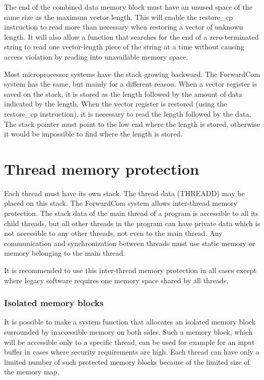 \documentclass[forwardcom.tex]{subfiles}
\begin{document}
\label{extraSpaceAtEndOfData}
The end of the combined data memory block must have an unused space of the same size as the maximum vector length. This will enable the restore\_cp instruction to read more than necessary when restoring a vector of unknown length. It will also allow a function that searches for the end of a zero-terminated string to read one vector-length piece of the string at a time without causing access violation by reading into unavailable memory space. 
\vspace{2mm}

Most microprocessor systems have the stack growing backward. The ForwardCom system has the same, but mainly for a different reason. When a vector register is saved on the stack, it is stored as the length followed by the amount of data indicated by the length. When the vector register is restored (using the restore\_cp instruction), it is necessary to read the length followed by the data. The stack pointer must point to the low end where the length is stored, otherwise it would be impossible to find where the length is stored. 

\section{Thread memory protection} \label{threadMemoryProtection}
Each thread must have its own stack. The thread data (THREADD) may be placed on this stack. The ForwardCom system allows inter-thread memory protection. The stack data of the main thread of a program is accessible to all its child threads, but all other threads in the program can have private data which is not accessible to any other threads, not even to the main thread. Any communication and synchronization between threads must use static memory or memory belonging to the main thread. 
\vspace{2mm}

It is recommended to use this inter-thread memory protection in all cases except where legacy software requires one memory space shared by all threads. 
\vspace{2mm}

\subsubsection{Isolated memory blocks} \label{isolatedMemoryBlocks}
It is possible to make a system function that allocates an isolated memory block surrounded by inaccessible memory on both sides. Such a memory block, which will be accessible only to a specific thread, can be used for example for an input buffer in cases where security requirements are high. Each thread can have only a limited number of such protected memory blocks because of the limited size of the memory map.
\end{document}
